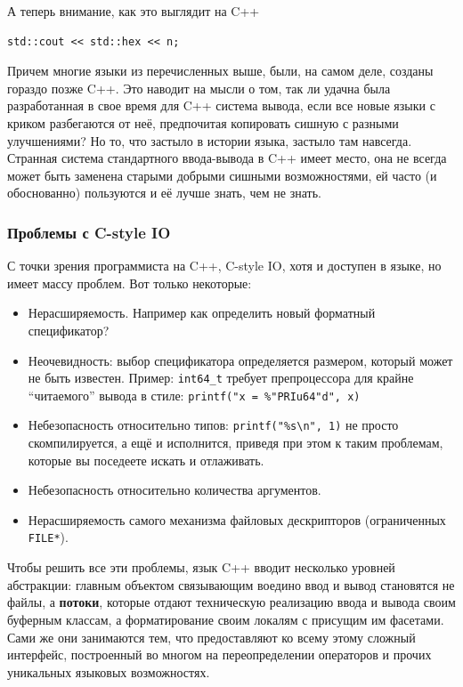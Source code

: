 \documentclass[a4paper,12pt,oneside]{article}
\begin{document}
А теперь внимание, как это выглядит на C++

\begin{lstlisting}
std::cout << std::hex << n;
\end{lstlisting}

Причем многие языки из перечисленных выше, были, на самом деле, созданы гораздо позже C++. Это наводит на мысли о том, так ли удачна была разработанная в свое время для C++ система вывода, если все новые языки с криком разбегаются от неё, предпочитая копировать сишную с разными улучшениями? Но то, что застыло в истории языка, застыло там навсегда. Странная система стандартного ввода-вывода в C++ имеет место, она не всегда может быть заменена старыми добрыми сишными возможностями, ей часто (и обоснованно) пользуются и её лучше знать, чем не знать.

\subsubsection{Проблемы с C-style IO}

С точки зрения программиста на C++, C-style IO, хотя и доступен в языке, но имеет массу проблем. Вот только некоторые:

\begin{itemize}
\item Нерасширяемость. Например как определить новый форматный спецификатор?
\item Неочевидность: выбор спецификатора определяется размером, который может не быть известен. Пример: \lstinline!int64_t! требует препроцессора для крайне ``читаемого'' вывода в стиле: \lstinline!printf("x = %"PRIu64"d", x)!
\item Небезопасность относительно типов: \lstinline!printf("%s\n", 1)! не просто скомпилируется, а ещё и исполнится, приведя при этом к таким проблемам, которые вы поседеете искать и отлаживать.
\item Небезопасность относительно количества аргументов.
\item Нерасширяемость самого механизма файловых дескрипторов (ограниченных \lstinline!FILE*!).
\end{itemize}

Чтобы решить все эти проблемы, язык C++ вводит несколько уровней абстракции: главным объектом связывающим воедино ввод и вывод становятся не файлы, а \textbf{потоки}, которые отдают техническую реализацию ввода и вывода своим буферным классам, а форматирование своим локалям с присущим им фасетами. Сами же они занимаются тем, что предоставляют ко всему этому сложный интерфейс, построенный во многом на переопределении операторов и прочих уникальных языковых возможностях.
\end{document}
